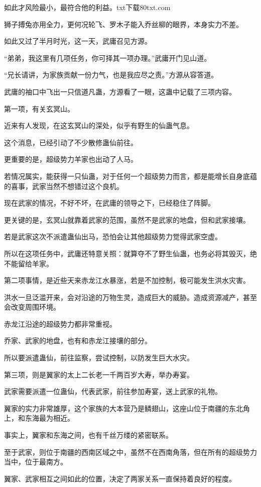 \begin{this_body}
如此才风险最小，最符合他的利益。txt下载80txt.com

狮子搏兔亦用全力，更何况轮飞、罗木子能入乔丝柳的眼界，本身实力不差。

如此又过了半月时光，这一天，武庸召见方源。

“弟弟，我这里有几项任务，你可择其一项办理。”武庸开门见山道。

“兄长请讲，为家族贡献一份力气，也是我应尽之责。”方源从容答道。

武庸的袖口中飞出一只信道凡蛊，方源看了一眼，这蛊中记载了三项内容。

第一项，有关玄冥山。

近来有人发现，在这玄冥山的深处，似乎有野生的仙蛊气息。

这个消息，已经引动了不少散修蛊仙前往。

更重要的是，超级势力羊家也出动了人马。

若情况属实，能获得一只仙蛊，对于任何一个超级势力而言，都是能增长自身底蕴的喜事，武家当然不想错过这个良机。

现在武家的情况，不好不坏，在武庸的领导之下，已经稳住了阵脚。

更关键的是，玄冥山就靠着武家的范围，虽然不是武家的地盘，但和武家接壤。

若是武家这次不派遣蛊仙出马，恐怕会让其他超级势力觉得武家空虚。

所以在这项任务中，武庸还特意关照：就算夺不了野生仙蛊，也务必将其毁灭，绝不能留给羊家。

第二项事情，是近些天来赤龙江水暴涨，若是不加控制，极可能发生洪水灾害。

洪水一旦泛滥开来，会对沿途的万物生灵，造成巨大的威胁。造成资源减产，甚至会改变周围环境。

赤龙江沿途的超级势力都非常重视。

乔家、武家的地盘，也有和赤龙江接壤的部分。

所以要派遣蛊仙，前往监察，尝试控制，以防发生巨大水灾。

第三项，则是翼家的太上二长老一千两百岁大寿，举办寿宴。

武家需要派遣一位蛊仙，代表武家，前往参加寿宴，送上武家的礼物。

翼家的实力非常雄厚，这个家族的大本营乃是鳞翅山，这座山位于南疆的东北角上，和东海最为相近。

事实上，翼家和东海之间，也有千丝万缕的紧密联系。

至于武家，则位于南疆的西南区域之中，虽然不在西南角落，但在所有的超级势力当中，位于最南方。

翼家、武家相互之间如此的位置，决定了两家关系一直保持着良好的程度。


\end{this_body}
